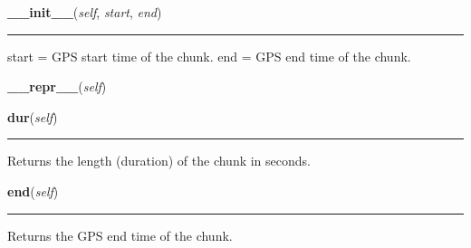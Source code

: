     \noindent\begin{boxedminipage}{\textwidth}

    \raggedright \textbf{\_\_init\_\_}(\textit{self}, \textit{start}, \textit{end})

    \vspace{-1.5ex}

    \rule{\textwidth}{0.5\fboxrule}
    start = GPS start time of the chunk. end = GPS end time of the chunk.

    \vspace{1ex}

    \end{boxedminipage}

    \label{pipeline:AnalysisChunk:__repr__}
    \vspace{0.5ex}

    \noindent\begin{boxedminipage}{\textwidth}

    \raggedright \textbf{\_\_repr\_\_}(\textit{self})

    \end{boxedminipage}

    \label{pipeline:AnalysisChunk:dur}
    \vspace{0.5ex}

    \noindent\begin{boxedminipage}{\textwidth}

    \raggedright \textbf{dur}(\textit{self})

    \vspace{-1.5ex}

    \rule{\textwidth}{0.5\fboxrule}
    Returns the length (duration) of the chunk in seconds.

    \vspace{1ex}

    \end{boxedminipage}

    \label{pipeline:AnalysisChunk:end}
    \vspace{0.5ex}

    \noindent\begin{boxedminipage}{\textwidth}

    \raggedright \textbf{end}(\textit{self})

    \vspace{-1.5ex}

    \rule{\textwidth}{0.5\fboxrule}
    Returns the GPS end time of the chunk.

    \vspace{1ex}

    \end{boxedminipage}

